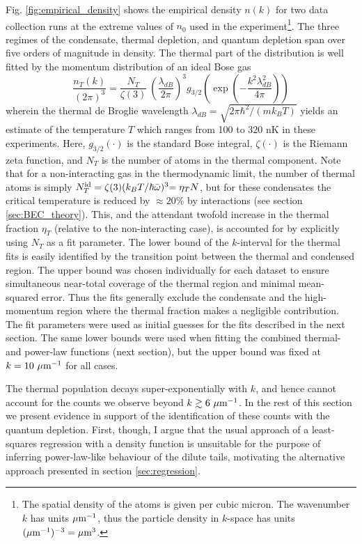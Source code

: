 	Fig. \ref{fig:empirical_density} shows the empirical density $n(k)$ for two data collection runs at the extreme values of $n_0$ used in the experiment\footnote{The spatial density of the atoms is given per cubic micron. The wavenumber $k$ has units $\mu\textrm{m}^{-1}$, thus the particle density in $k$-space has units $(\mu\textrm{m}^{-1})^{-3}=\mu\textrm{m}^{3}$.}. The three regimes of the condensate, thermal depletion, and quantum depletion span over five orders of magnitude in density. The thermal part of the distribution is well fitted by the momentum distribution of an ideal Bose gas \cite{Dalfovo99}
	\begin{equation}
		\frac{n_T(k)}{{(2\pi)^3}} =\frac{N_T}{\zeta(3)} ~\left(\frac{\lambda_{dB}}{2\pi}\right)^3 g_{3/2}\left(\exp\left(-\frac{k^2 \lambda_{dB}^2}{4\pi}\right)\right)
		\label{eqn:th_fun}
	\end{equation}
	wherein the thermal de Broglie wavelength $\lambda_{dB} = \sqrt{2\pi\hbar^2/(m k_B T)}$ yields an estimate of the temperature $T$ which ranges from 100 to 320 nK in these experiments. Here, $g_{3/2}(\cdot)$ is the standard Bose integral, $\zeta(\cdot)$ is the Riemann zeta function, and $N_T$ is the number of atoms in the thermal component. 
	Note that for a non-interacting gas in the thermodynamic limit, the {number of thermal atoms} 
	is simply ${N_T^{\rm id}} = \zeta(3)(k_B T / \hbar\bar{\omega})^3{=\eta_T N}$, but for these condensates the critical temperature is reduced by $\approx20\%$ by interactions (see section \ref{sec:BEC_theory}).
	This, and the attendant twofold increase in the thermal fraction {$\eta_T$}  (relative to the non-interacting case), is accounted for by explicitly using $N_T$ as a fit parameter. 
	The lower bound of the $k$-interval for the thermal fits is easily identified by the transition point between the thermal and condensed region. The upper bound was chosen individually for each dataset to ensure simultaneous near-total coverage of the thermal region and minimal mean-squared error. Thus the fits generally exclude the condensate and the high-momentum region where the thermal fraction makes a negligible contribution. The fit parameters were used as initial guesses for the fits described in the next section.
	The same lower bounds were used when fitting the combined thermal- and power-law functions (next section), but the upper bound was fixed at $k=10~\mu\textrm{m}^{-1}$ for all cases.


	The thermal population decays super-exponentially with $k$, and hence cannot account for the counts we observe beyond $k\gtrsim 6~\mu\textrm{m}^{-1}$. 
	In the rest of this section we present evidence in support of the identification of these counts with the quantum depletion. 
	First, though, I argue that the usual approach of a least-squares regression with a density function is unsuitable for the purpose of inferring power-law-like behaviour of the dilute tails, motivating the alternative approach presented in section \ref{sec:regression}.

